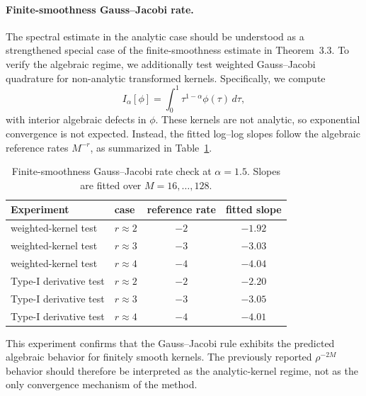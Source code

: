 \paragraph{Finite-smoothness Gauss--Jacobi rate.}
The spectral estimate in the analytic case should be understood as a strengthened special case of the finite-smoothness estimate in Theorem~3.3.  To verify the algebraic regime, we additionally test weighted Gauss--Jacobi quadrature for non-analytic transformed kernels.  Specifically, we compute
\[
  I_\alpha[\phi]=\int_0^1 \tau^{1-\alpha}\phi(\tau)\,d\tau,
\]
with interior algebraic defects in \(\phi\).  These kernels are not analytic, so exponential convergence is not expected.  Instead, the fitted log--log slopes follow the algebraic reference rates \(M^{-r}\), as summarized in Table~\ref{tab:gj_mr_rate}.

\begin{table}[htbp]
\centering
\caption{Finite-smoothness Gauss--Jacobi rate check at \(\alpha=1.5\).  Slopes are fitted over \(M=16,\ldots,128\).}
\label{tab:gj_mr_rate}
\begin{tabular}{llcc}
\hline
Experiment & case & reference rate & fitted slope \\
\hline
weighted-kernel test & \(r\approx2\) & \(-2\) & \(-1.92\) \\
weighted-kernel test & \(r\approx3\) & \(-3\) & \(-3.03\) \\
weighted-kernel test & \(r\approx4\) & \(-4\) & \(-4.04\) \\
Type-I derivative test & \(r\approx2\) & \(-2\) & \(-2.20\) \\
Type-I derivative test & \(r\approx3\) & \(-3\) & \(-3.05\) \\
Type-I derivative test & \(r\approx4\) & \(-4\) & \(-4.01\) \\
\hline
\end{tabular}
\end{table}

This experiment confirms that the Gauss--Jacobi rule exhibits the predicted algebraic behavior for finitely smooth kernels.  The previously reported \(\rho^{-2M}\) behavior should therefore be interpreted as the analytic-kernel regime, not as the only convergence mechanism of the method.
